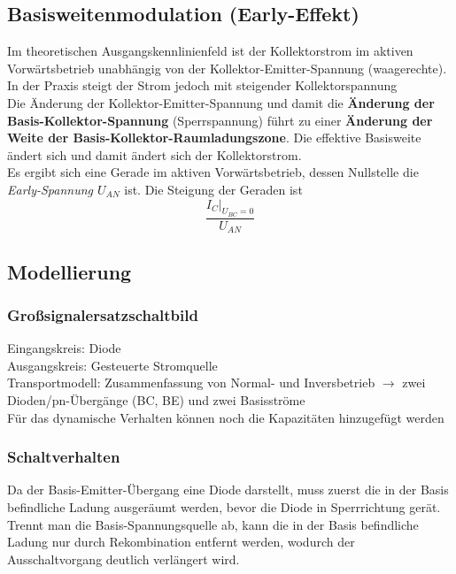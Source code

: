 \documentclass[a4paper, 12pt]{article}
\begin{document}
\subsection*{Basisweitenmodulation (Early-Effekt)}
Im theoretischen Ausgangskennlinienfeld ist der Kollektorstrom im aktiven
Vorwärtsbetrieb unabhängig von der Kollektor-Emitter-Spannung (waagerechte). In
der Praxis steigt der Strom jedoch mit steigender Kollektorspannung\\

Die Änderung der Kollektor-Emitter-Spannung und damit die \textbf{Änderung der
Basis-Kollektor-Spannung} (Sperrspannung) führt zu einer \textbf{Änderung der Weite der
Basis-Kollektor-Raumladungszone}. Die effektive Basisweite ändert sich und damit
ändert sich der Kollektorstrom. \\

Es ergibt sich eine Gerade im aktiven
Vorwärtsbetrieb, dessen Nullstelle die \emph{Early-Spannung $U_{AN}$} ist. Die
Steigung der Geraden ist
\[\frac{I_C|_{U_{BC} = 0}}{U_{AN}}\]

\subsection*{Modellierung}
\subsubsection*{Großsignalersatzschaltbild}
Eingangskreis: Diode\\
Ausgangskreis: Gesteuerte Stromquelle\\

Transportmodell: Zusammenfassung von Normal- und Inversbetrieb $\rightarrow$
zwei Dioden/pn-Übergänge (BC, BE) und zwei Basisströme\\

Für das dynamische Verhalten können noch die Kapazitäten hinzugefügt werden\\

\subsubsection*{Schaltverhalten}
Da der Basis-Emitter-Übergang eine Diode darstellt, muss zuerst die in der Basis
befindliche Ladung ausgeräumt werden, bevor die Diode in Sperrrichtung gerät.\\

Trennt man die Basis-Spannungsquelle ab, kann die in der Basis befindliche
Ladung nur durch Rekombination entfernt werden, wodurch der Ausschaltvorgang
deutlich verlängert wird.\\
\end{document}
